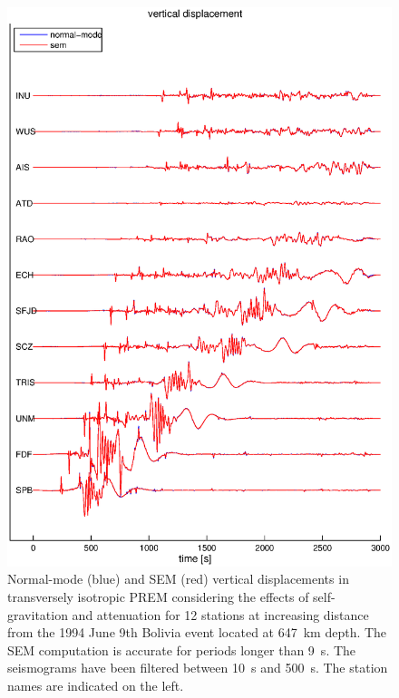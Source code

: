 \documentclass[oneside,english]{book}
\begin{document}
\begin{figure}[ht]
\noindent \begin{centering}
\includegraphics[scale=0.75]{figures/bolivia_vertical.eps}\caption{\label{fig:Bolivia-with-Vertical}Normal-mode (blue) and SEM (red)
vertical displacements in transversely isotropic PREM considering
the effects of self-gravitation and attenuation for 12 stations at
increasing distance from the 1994 June 9th Bolivia event located at
647~km depth. The SEM computation is accurate for periods longer
than 9~s. The seismograms have been filtered between 10~s and 500~s.
The station names are indicated on the left.}

\par\end{centering}
\end{figure}
%
\end{document}
